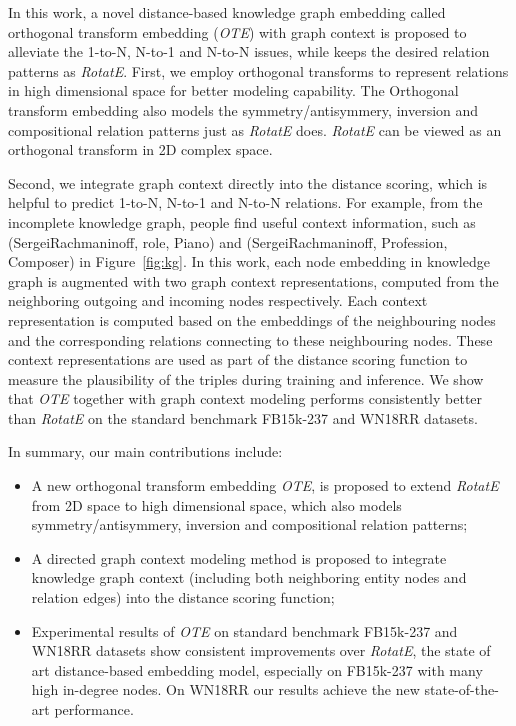\documentclass[11pt,a4paper]{article}
\begin{document}
In this work, a novel distance-based knowledge graph embedding called orthogonal transform embedding ({\it OTE}) with graph context is proposed to alleviate the 1-to-N, N-to-1 and N-to-N issues, while keeps the desired relation patterns as {\it RotatE}.
First, we employ orthogonal transforms to represent relations in high dimensional space for better modeling capability. The Orthogonal transform embedding also models the symmetry/antisymmery, inversion and compositional relation patterns just as {\it RotatE} does. {\it RotatE} can be viewed as an orthogonal transform in 2D complex space. 


Second, we integrate graph context directly into the distance scoring, which is helpful to predict 1-to-N, N-to-1 and N-to-N relations. For example,
from the incomplete knowledge graph, people find useful context information, such as (SergeiRachmaninoff, role, Piano) and (SergeiRachmaninoff, Profession, Composer) in Figure~\ref{fig:kg}.
In this work, each node embedding in knowledge graph is augmented with two graph context representations, computed from the neighboring outgoing and incoming nodes respectively.
Each context representation is 
computed based on the embeddings of the neighbouring nodes and the corresponding relations connecting to these neighbouring nodes.
These context representations are  used as part of the distance scoring function to measure the plausibility of the triples during training and inference. 
We show that {\em OTE } together with graph context modeling performs consistently better than {\em RotatE} on the standard benchmark FB15k-237 and WN18RR datasets.






 In summary, our main contributions include:
 \begin{itemize}[leftmargin=10pt]
     \item A new orthogonal transform embedding {\it OTE}, is proposed to extend {\it RotatE} from 2D space to high dimensional space, which also models symmetry/antisymmery, inversion and compositional relation patterns;
\item A directed graph context modeling method is proposed to integrate knowledge graph context (including both neighboring entity nodes and relation edges) into the distance scoring function;
     \item Experimental results of {\it OTE} on standard benchmark FB15k-237 and WN18RR datasets show consistent improvements over {\it RotatE}, the state of art distance-based embedding model, especially on FB15k-237 with many high in-degree nodes. On WN18RR our results achieve the new state-of-the-art performance.
 \end{itemize}
\end{document}
